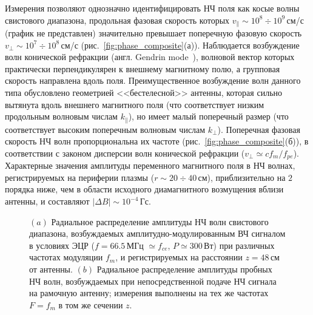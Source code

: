 \documentclass[autoref,10pt]{disser}
\begin{document}
%  

Измерения позволяют однозначно идентифицировать НЧ поля как косые волны свистового диапазона, продольная фазовая скорость которых $v_{\parallel}\sim 10^8 \div 10^9$\,см/с (график не представлен) значительно превышает поперечную фазовую скорость $v_{\perp}\sim 10^7 \div 10^8$\,см/с (\mbox{рис.~\ref{fig:phase_composite}(а)}). Наблюдается возбуждение волн конической рефракции (англ. Gendrin mode~\cite{Helliwell}), волновой вектор которых практически перпендикулярен к внешнему магнитному полю, а групповая скорость направлена вдоль поля. Преимущественное возбуждение волн данного типа обусловлено геометрией <<бестелесной>> антенны, которая сильно вытянута вдоль внешнего магнитного поля (что соответствует низким продольным волновым числам $k_{\parallel}$), но имеет малый поперечный размер (что соответствует высоким поперечным волновым числам $k_{\perp}$). Поперечная фазовая скорость НЧ волн пропорциональна их частоте (\mbox{рис.~\ref{fig:phase_composite}(б))}, в соответствии с законом дисперсии волн конической рефракции ($v_{\perp}\simeq c f_m/f_{pe}$). Характерные значения амплитуды переменного магнитного поля в НЧ волнах, регистрируемых на периферии плазмы ($r\sim 20\div 40$\,см), приблизительно на $2$ порядка ниже, чем в области исходного диамагнитного возмущения вблизи антенны, и составляют $|\Delta B|\sim 10^{-4}$\,Гс.

\begin{figure}[H]
  \centering
  \def\svgwidth{0.6\columnwidth} %
  
  \vspace{0.7cm}
  \caption{$(a)$ Радиальное распределение амплитуды НЧ волн свистового диапазона, возбуждаемых амплитудно-модулированным ВЧ сигналом в условиях ЭЦР ($f=66.5$\,МГц $\simeq f_{ce}$, $P\simeq 300$\,Вт) при различных частотах модуляции $f_{m}$, и регистрируемых на расстоянии $z=48$\,см от антенны. $(b)$ Радиальное распределение амплитуды пробных НЧ волн, возбуждаемых при непосредственной подаче НЧ сигнала на рамочную антенну; измерения выполнены на тех же частотах $F=f_m$ в том же сечении $z$.}
  \label{fig:param_vs_dir}
\end{figure} 
 
\end{document}
